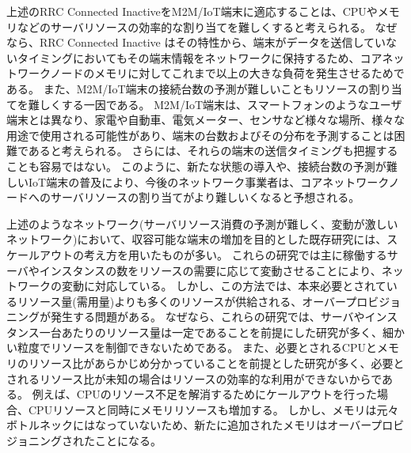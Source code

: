 \documentclass[a4j]{ujarticle}
\begin{document}
上述のRRC Connected InactiveをM2M/IoT端末に適応することは、CPUやメモリなどのサーバリソースの効率的な割り当てを難しくすると考えられる。
なぜなら、RRC Connected Inactive	はその特性から、端末がデータを送信していないタイミングにおいてもその端末情報をネットワークに保持するため、コアネットワークノードのメモリに対してこれまで以上の大きな負荷を発生させるためである。
また、M2M/IoT端末の接続台数の予測が難しいこともリソースの割り当てを難しくする一因である。
M2M/IoT端末は、スマートフォンのようなユーザ端末とは異なり、家電や自動車、電気メーター、センサなど様々な場所、様々な用途で使用される可能性があり、端末の台数およびその分布を予測することは困難であると考えられる。
さらには、それらの端末の送信タイミングも把握することも容易ではない。
このように、新たな状態の導入や、接続台数の予測が難しいIoT端末の普及により、今後のネットワーク事業者は、コアネットワークノードへのサーバリソースの割り当てがより難しいくなると予想される。

上述のようなネットワーク(サーバリソース消費の予測が難しく、変動が激しいネットワーク)において、収容可能な端末の増加を目的とした既存研究には、スケールアウトの考え方を用いたものが多い。
これらの研究では主に稼働するサーバやインスタンスの数をリソースの需要に応じて変動させることにより、ネットワークの変動に対応している。
しかし、この方法では、本来必要とされているリソース量(需用量)よりも多くのリソースが供給される、オーバープロビジョニングが発生する問題がある。
なぜなら、これらの研究では、サーバやインスタンス一台あたりのリソース量は一定であることを前提にした研究が多く、細かい粒度でリソースを制御できないためである。
また、必要とされるCPUとメモリのリソース比があらかじめ分かっていることを前提とした研究が多く、必要とされるリソース比が未知の場合はリソースの効率的な利用ができないからである。
例えば、CPUのリソース不足を解消するためにケールアウトを行った場合、CPUリソースと同時にメモリリソースも増加する。
しかし、メモリは元々ボトルネックにはなっていないため、新たに追加されたメモリはオーバープロビジョニングされたことになる。
\end{document}

